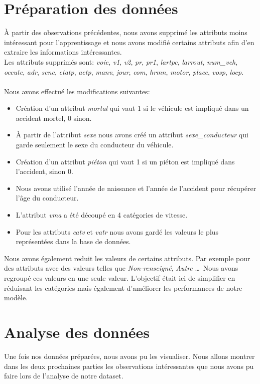 \documentclass{article}
\begin{document}
    \section{Préparation des données}
    À partir des observations précédentes, nous avons supprimé les attributs moins intéressant pour l'apprentissage 
    et nous avons modifié certains attributs afin d'en extraire les informations intéressantes.
    \\
    Les attributs supprimés sont: \textit{voie}, \textit{v1}, \textit{v2}, \textit{pr}, \textit{pr1}, \textit{lartpc},
     \textit{larrout}, \textit{num\_veh}, \textit{occutc}, \textit{adr}, \textit{senc}, \textit{etatp}, \textit{actp}, 
     \textit{manv}, \textit{jour}, \textit{com}, \textit{hrmn}, \textit{motor}, \textit{place}, \textit{vosp}, \textit{locp}.
    \\\\
    Nous avons effectué les modifications suivantes:
    \begin{itemize}
        \item Création d'un attribut \textit{mortal} qui vaut 1 si le véhicule est impliqué dans un accident mortel, 0 sinon.
        \item À partir de l'attribut \textit{sexe} nous avons créé un attribut \textit{sexe\_conducteur} qui garde seulement 
                le sexe du conducteur du véhicule.
        \item Création d'un attribut \textit{piéton} qui vaut 1 si un piéton est impliqué dans l'accident, sinon 0.
        \item Nous avons utilisé l'année de naissance et l'année de l'accident pour récupérer l'âge du conducteur.
        \item L'attribut \textit{vma} a été découpé en 4 catégories de vitesse.
        \item Pour les attributs \textit{catv} et \textit{vatr} nous avons gardé les valeurs le plus représentées dans la base de données.
    \end{itemize}
    \vspace{0.5cm}
    Nous avons également reduit les valeurs de certains attributs. Par exemple pour des attributs 
    avec des valeurs telles que \textit{Non-renseigné}, \textit{Autre} \dots \, Nous avons regroupé 
    ces valeurs en une seule valeur. L'objectif était ici de simplifier en réduisant les catégories 
    mais également d'améliorer les performances de notre modèle.

    \section{Analyse des données}
    Une fois nos données préparées, nous avons pu les visualiser. Nous allons montrer dans les 
    deux prochaines parties les observations intéressantes que nous avons pu faire lors de 
    l'analyse de notre dataset.
\end{document}
